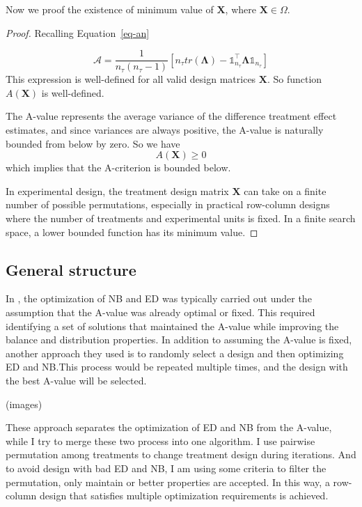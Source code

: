 \documentclass[
  a4paper,
  oneside,
  openany,
  12pt,
  onecolumn]{book}
\theoremstyle{plain}
\theoremstyle{definition}
\theoremstyle{remark}
\begin{document}
Now we proof the existence of minimum value of \(\boldsymbol{X}\), where
\(\boldsymbol{X}\in\Omega\).

\begin{proof}
Recalling Equation~\ref{eq-an}

\[
\mathscr{A}=\frac{1}{n_{\tau}(n_{\tau}-1)}[n_{\tau}tr(\boldsymbol{\Lambda})-\mathbb{1}_{n_{\tau}}^\top\boldsymbol{\Lambda}\mathbb{1}_{n_{\tau}}]
\] This expression is well-defined for all valid design matrices
\(\boldsymbol{X}\). So function \(A(\boldsymbol{X})\) is well-defined.

The A-value represents the average variance of the difference treatment
effect estimates, and since variances are always positive, the A-value
is naturally bounded from below by zero. So we have \[
A(\boldsymbol{X})\geq0
\] which implies that the A-criterion is bounded below.

In experimental design, the treatment design matrix \(\boldsymbol{X}\)
can take on a finite number of possible permutations, especially in
practical row-column designs where the number of treatments and
experimental units is fixed. In a finite search space, a lower bounded
function has its minimum value.
\end{proof}

\subsection{General structure}\label{general-structure}

In \citet{piepho2018neighbor}, the optimization of NB and ED was
typically carried out under the assumption that the A-value was already
optimal or fixed. This required identifying a set of solutions that
maintained the A-value while improving the balance and distribution
properties. In addition to assuming the A-value is fixed, another
approach they used is to randomly select a design and then optimizing ED
and NB.This process would be repeated multiple times, and the design
with the best A-value will be selected.

(images)

These approach separates the optimization of ED and NB from the A-value,
while I try to merge these two process into one algorithm. I use
pairwise permutation among treatments to change treatment design during
iterations. And to avoid design with bad ED and NB, I am using some
criteria to filter the permutation, only maintain or better properties
are accepted. In this way, a row-column design that satisfies multiple
optimization requirements is achieved.
\end{document}
